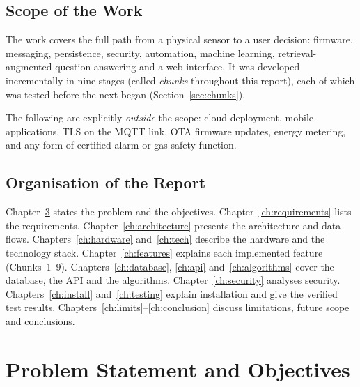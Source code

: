 \documentclass[12pt,a4paper,oneside]{report}
\begin{document}
\section{Scope of the Work}
The work covers the full path from a physical sensor to a user decision: firmware, messaging, persistence, security, automation, machine learning, retrieval-augmented question answering and a web interface. It was developed incrementally in nine stages (called \emph{chunks} throughout this report), each of which was tested before the next began (Section~\ref{sec:chunks}).

The following are explicitly \emph{outside} the scope: cloud deployment, mobile applications, TLS on the MQTT link, OTA firmware updates, energy metering, and any form of certified alarm or gas-safety function.

\section{Organisation of the Report}
Chapter~\ref{ch:problem} states the problem and the objectives. Chapter~\ref{ch:requirements} lists the requirements. Chapter~\ref{ch:architecture} presents the architecture and data flows. Chapters~\ref{ch:hardware} and~\ref{ch:tech} describe the hardware and the technology stack. Chapter~\ref{ch:features} explains each implemented feature (Chunks~1--9). Chapters~\ref{ch:database}, \ref{ch:api} and~\ref{ch:algorithms} cover the database, the API and the algorithms. Chapter~\ref{ch:security} analyses security. Chapters~\ref{ch:install} and~\ref{ch:testing} explain installation and give the verified test results. Chapters~\ref{ch:limits}--\ref{ch:conclusion} discuss limitations, future scope and conclusions.

\chapter{Problem Statement and Objectives}
\label{ch:problem}
\end{document}

